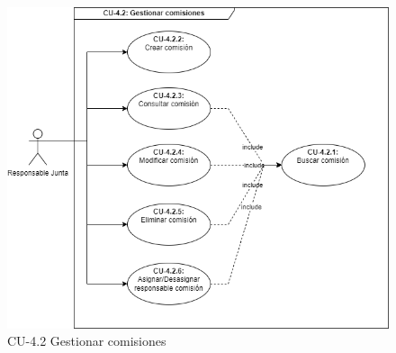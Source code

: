\begin{figure}[H]
        \centering
        \includegraphics[scale=0.55]{img/diagramas/Funcional/CU-4.2.png}
        \caption{CU-4.2 Gestionar comisiones}
        \label{fig:Diagrama-Caso de uso 4.2 Gestionar comisiones}
    \end{figure}


